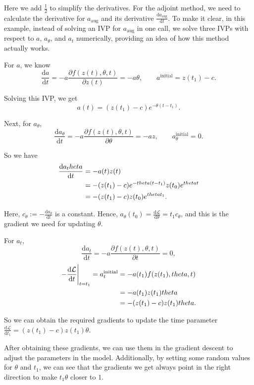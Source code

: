 \documentclass[a4paper,11pt,titlepage]{article}
\theoremstyle{definition}
\theoremstyle{plain}
\theoremstyle{remark}
\begin{document}
Here we add $\frac{1}{2}$ to simplify the derivatives.
For the adjoint method, we need to calculate the derivative for $a_{\mathrm{aug}}$ and its derivative $\frac{\mathrm{d}a_{\mathrm{aug}}}{\mathrm{d}t}$. To make it clear, in this example, instead of solving an IVP for $a_{\mathrm{aug}}$ in one call, we solve three IVPs with respect to $a$, $a_\theta$, and $a_t$ numerically, providing an idea of how this method actually works.

For $a$, we know $$\frac{\mathrm{d}{a}}{\mathrm{d}{t}}=-a\frac{\partial f(z(t),\theta,t)}{\partial z(t)}=-a\theta,\quad\quad a^{\mathrm{initial}} = z(t_1)-c.$$

Solving this IVP, we get $$a(t)= (z(t_1)-c)e^{-\theta(t-t_1)}.$$

Next, for $a_\theta$, $$\frac{\mathrm{d}{a_\theta}}{\mathrm{d}{t}}=-a\frac{\partial f(z(t),\theta,t)}{\partial \theta}=-az,\quad\quad a^{\mathrm{initial}}_\theta=0.$$

So we have
\begin{align}
\frac{\mathrm{d}{a_\theta}}{\mathrm{d}{t}}&=-a(t)z(t)\notag\\
&= -(z(t_1)-c)e^{-\theta(t-t_1)}z(t_0)e^{\theta t}\notag\\
&= -(z(t_1)-c)z(t_0)e^{\theta t_1}.\notag
\end{align}

Here, $c_\theta:=-\frac{\mathrm{d}{a_\theta}}{\mathrm{d}{t}}$ is a constant. Hence, $a_\theta(t_0) =\frac{\mathrm{d}\mathcal{L}}{\mathrm{d}\theta} =t_1c_\theta$, and this is the gradient we need for updating $\theta$.

For $a_t$,
$$
\frac{\mathrm{d}{a_t}}{\mathrm{d}{t}}=-a\frac{\partial f(z(t),\theta,t)}{\partial t}=0,
$$
\begin{align}
-\frac{\mathrm{d}\mathcal{L}}{\mathrm{d}t}\Bigg|_{t=t_1}=a^{\mathrm{initial}}_t &= -a(t_1)f(z(t_1),\theta,t)\notag\\
&=-a(t_1)z(t_1)\theta\notag\\
&=-(z(t_1)-c)z(t_1)\theta.\notag
\end{align}

So we can obtain the required gradients to update the time parameter $\frac{\mathrm{d}\mathcal{L}}{\mathrm{d}t_1}=(z(t_1)-c)z(t_1)\theta$.

After obtaining these gradients, we can use them in the gradient descent to adjust the parameters in the model. Additionally, by setting some random values for $\theta$ and $t_1$, we can see that the gradients we get always point in the right direction to make $t_1\theta$ closer to $1$.
\end{document}
